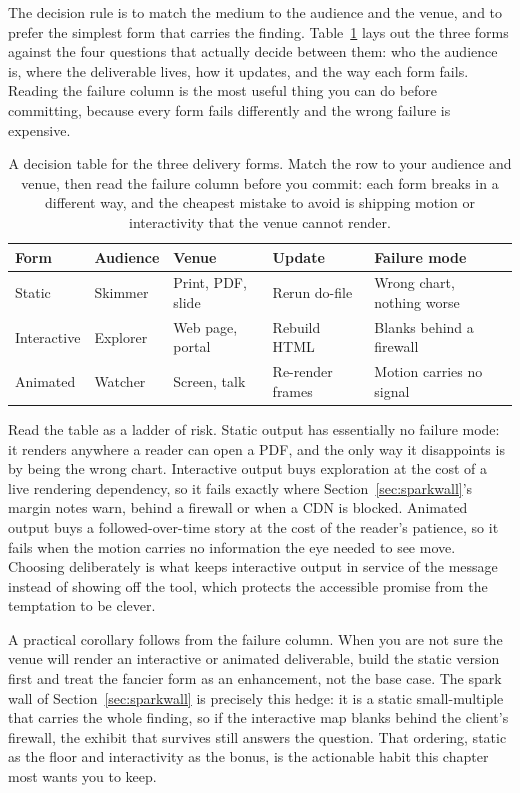 \documentclass[
    a4paper,
    fontsize=10pt,
    twoside=true,
    numbers=noenddot,
]{kaobook}
\begin{document}
The decision rule is to match the medium to the audience and the venue, and to prefer the simplest form that carries the finding. Table~\ref{tab:interactive-choice} lays out the three forms against the four questions that actually decide between them: who the audience is, where the deliverable lives, how it updates, and the way each form fails. Reading the failure column is the most useful thing you can do before committing, because every form fails differently and the wrong failure is expensive.

\begin{table}[htbp]
\centering
\caption[Choosing static, interactive, or animated]{A decision table for the three delivery forms. Match the row to your audience and venue, then read the failure column before you commit: each form breaks in a different way, and the cheapest mistake to avoid is shipping motion or interactivity that the venue cannot render.}
\label{tab:interactive-choice}
{\footnotesize
\begin{tabular}{lllll}
\hline
Form & Audience & Venue & Update & Failure mode \\
\hline
Static & Skimmer & Print, PDF, slide & Rerun do-file & Wrong chart, nothing worse \\
Interactive & Explorer & Web page, portal & Rebuild HTML & Blanks behind a firewall \\
Animated & Watcher & Screen, talk & Re-render frames & Motion carries no signal \\
\hline
\end{tabular}
}
\end{table}

Read the table as a ladder of risk. Static output has essentially no failure mode: it renders anywhere a reader can open a PDF, and the only way it disappoints is by being the wrong chart. Interactive output buys exploration at the cost of a live rendering dependency, so it fails exactly where Section~\ref{sec:sparkwall}'s margin notes warn, behind a firewall or when a CDN is blocked. Animated output buys a followed-over-time story at the cost of the reader's patience, so it fails when the motion carries no information the eye needed to see move. Choosing deliberately is what keeps interactive output in service of the message instead of showing off the tool, which protects the accessible promise from the temptation to be clever.

A practical corollary follows from the failure column. When you are not sure the venue will render an interactive or animated deliverable, build the static version first and treat the fancier form as an enhancement, not the base case. The spark wall of Section~\ref{sec:sparkwall} is precisely this hedge: it is a static small-multiple that carries the whole finding, so if the interactive map blanks behind the client's firewall, the exhibit that survives still answers the question. That ordering, static as the floor and interactivity as the bonus, is the actionable habit this chapter most wants you to keep.
\end{document}
